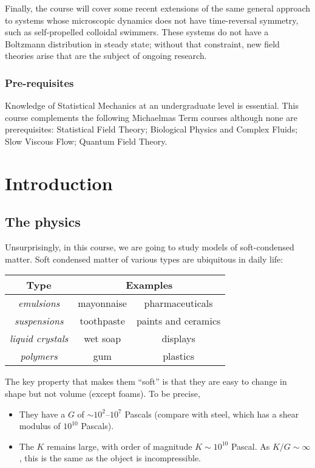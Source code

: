 \documentclass[a4paper]{article}
\begin{document}
{Finally, the course will cover some recent extensions of the same general approach to systems whose microscopic dynamics does not have time-reversal symmetry, such as self-propelled colloidal swimmers. These systems do not have a Boltzmann distribution in steady state; without that constraint, new field theories arise that are the subject of ongoing research.
\subsubsection*{Pre-requisites}
Knowledge of Statistical Mechanics at an undergraduate level is essential. This course complements the following Michaelmas Term courses although none are prerequisites: Statistical Field Theory; Biological Physics and Complex Fluids; Slow Viscous Flow; Quantum Field Theory.
}
\tableofcontents

\setcounter{section}{-1}
\section{Introduction}
\subsection{The physics}
Unsurprisingly, in this course, we are going to study models of soft-condensed matter. Soft condensed matter of various types are ubiquitous in daily life:
\begin{center}
  \begin{tabular}{ccc}
    \toprule
    \textbf{Type} & \multicolumn{2}{c}{\textbf{Examples}}\\
    \midrule
    \emph{emulsions} & mayonnaise & pharmaceuticals \\
    \emph{suspensions} & toothpaste & paints and ceramics\\
    \emph{liquid crystals} & wet soap & displays \\
    \emph{polymers} & gum & plastics\\
    \bottomrule
  \end{tabular}
\end{center}
The key property that makes them ``soft'' is that they are easy to change in shape but not volume (except foams). To be precise,
\begin{itemize}
  \item They have a  $G$ of $\sim 10^2$--$10^7$ Pascals (compare with steel, which has a shear modulus of $10^{10}$ Pascals).

  \item The  $K$ remains large, with order of magnitude $K \sim 10^{10}$ Pascal. As $K/G \sim \infty$, this is the same as the object is incompressible.
\end{itemize}
\end{document}
